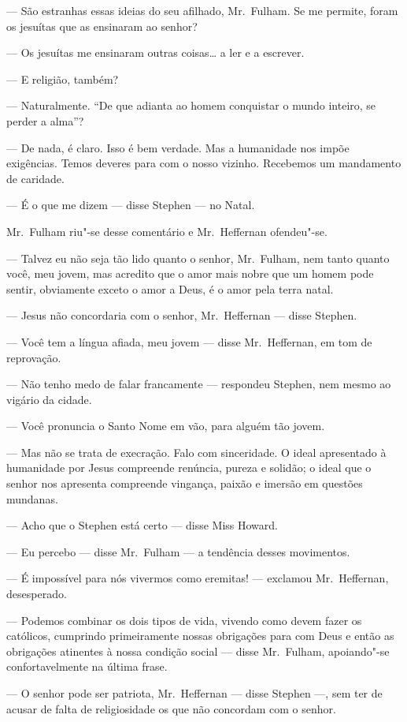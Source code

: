 --- São estranhas essas ideias do seu afilhado, Mr.~Fulham.  Se
me permite, foram os jesuítas que as ensinaram ao senhor?

--- Os jesuítas me ensinaram outras coisas\ldots{} a ler e a escrever.

--- E religião, também?

--- Naturalmente.  “De que adianta ao homem conquistar o mundo
inteiro, se perder a alma”?

--- De nada, é claro.  Isso é bem verdade.  Mas a humanidade nos
impõe exigências.  Temos deveres para com o nosso vizinho.  Recebemos
um mandamento de caridade.

--- É o que me dizem --- disse Stephen --- no Natal.  

Mr.~Fulham riu"-se desse comentário e Mr.~Heffernan ofendeu"-se.

--- Talvez eu não seja tão lido quanto o senhor, Mr.~Fulham, nem
tanto quanto você, meu jovem, mas acredito que o amor mais nobre que um
homem pode sentir, obviamente exceto o amor a Deus, é o amor pela terra
natal.

--- Jesus não concordaria com o senhor, Mr.~Heffernan --- disse
Stephen.

--- Você tem a língua afiada, meu jovem --- disse Mr.~Heffernan, em
tom de reprovação.

--- Não tenho medo de falar francamente --- respondeu Stephen, nem
mesmo ao vigário da cidade.

--- Você pronuncia o Santo Nome em vão, para alguém tão jovem.

--- Mas não se trata de execração.  Falo com sinceridade.  O
ideal apresentado à humanidade por Jesus compreende renúncia, pureza e
solidão; o ideal que o senhor nos apresenta compreende vingança, paixão
e imersão em questões mundanas.

--- Acho que o Stephen está certo --- disse Miss Howard.

--- Eu percebo --- disse Mr.~Fulham --- a tendência desses
movimentos.

--- É impossível para nós vivermos como eremitas! --- exclamou Mr.~Heffernan, desesperado.

--- Podemos combinar os dois tipos de vida, vivendo como devem
fazer os católicos, cumprindo primeiramente nossas obrigações para com
Deus e então as obrigações atinentes à nossa condição social --- disse
Mr.~Fulham, apoiando"-se confortavelmente na última frase.

--- O senhor pode ser patriota, Mr.~Heffernan --- disse Stephen ---,
sem ter de acusar de falta de religiosidade os que não concordam com o
senhor.

